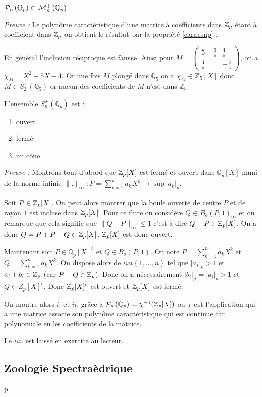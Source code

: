 \begin{consequence}
	$\mathcal{P}_n \left( \mathbb{Q}_p \right) \subset \mathcal{M}_n^+\left( \mathbb{Q}_p \right)$ 
\end{consequence}

\textit{Preuve : }  Le polynôme caractéristique d'une matrice à coefficients dans $ \mathbb {Z}_p $ étant à coefficient dans $ \mathbb {Z}_p $ on obtient le résultat par la propriété \ref{caracsnp} .

\begin{remarque}
	En général l'inclusion réciproque est fausse. Ainsi pour $M = \begin{pmatrix} 5 + \frac{3}{5} & \frac{4}{5} \\ \frac{4}{5} & -\frac{3}{5} \end{pmatrix} $, on a $\chi_M = X^2  - 5 X - 4$. Or une fois $M$ plongé dans $\mathbb{Q}_5$ on a $\chi_M \in \mathbb{Z}_5[X]$ donc $M \in S_2^+\left( \mathbb{Q}_5 \right)$ or aucun des coefficients de $M$ n'est dans $\mathbb{Z}_5 $
\end{remarque}

\begin{propriete}
	L'ensemble $S_n^+\left( \mathbb{Q}_p \right)$  est :
	\begin{enumerate}[label = \textit{\roman*}.]
		\item ouvert
		\item fermé
		\item un cône
	\end{enumerate}
\end{propriete}

\textit{Preuve :}  
Montrons tout d'abord que $ \mathbb {Z}_p [X]$ est fermé et ouvert dans $\mathbb{Q}_{ p }[X] $ muni de la norme infinie $\|.\|_\infty : P = \sum_{k=1}^{n} a_k X^k \to \sup |a_k|_p$. 

Soit $P \in  \mathbb {Z}_p [X]$. On peut alors montrer que la boule ouverte de centre $P$ et de rayon $1$ est incluse dans $ \mathbb {Z}_p [X]$. Pour ce faire on considère $Q \in B_{o}\left( P,1 \right)_\infty $ et on remarque que cela signifie que $\|Q-P\|_\infty \le 1$ c'est-à-dire $Q-P \in  \mathbb {Z}_p [X]$. On a donc $Q = P + P-Q \in  \mathbb {Z}_p [X]$. 
$ \mathbb {Z}_p [X]$ est donc ouvert.

Maintenant soit $P \in \mathbb{Q}_{ p } [X]^c$ et $Q \in B_o\left( P, 1 \right) $. On note $P = \sum_{k=1}^{n} a_k X^k$ et $Q = \sum_{k=1}^{n} a_k X^k$. On dispose alors de $i in \left\{  1,\ldots,n \right\} $ tel que $|a_{i}|_p >1$ et $a_i + b_{i} \in  \mathbb {Z}_p $ (car $P-Q \in  \mathbb {Z}_p $). Donc on a nécessairement $|b_i|_p = |a_i|_p > 1$ et $Q \in Z_p[X]^c$.
Donc $ \mathbb {Z}_p [X]^c$ est ouvert et $ \mathbb {Z}_p [X]$ est fermé. 

 
On montre alors $i.$ et $ii.$ grâce à $\mathcal{P}_n \left( \mathbb{Q}_p \right) = \chi^{-1}(  \mathbb {Z}_p [X]) $ ou $\chi$ est l'application qui a une matrice associe son polynôme caractéristique qui est continue car polynomiale en les coefficients de la matrice.



Le $iii$. est laissé en exercice au lecteur. 


\subsection{Zoologie Spectraèdrique}
p
